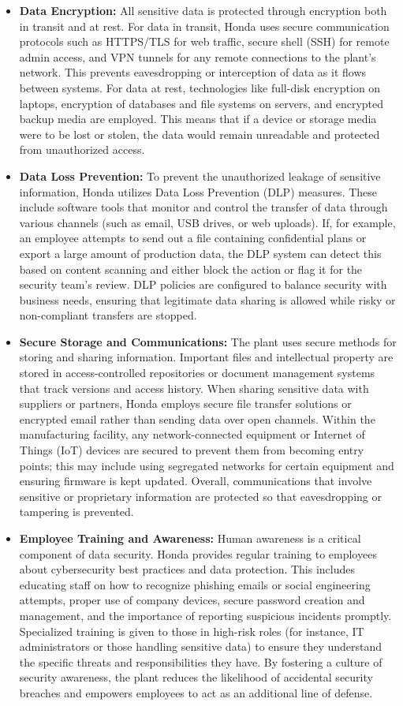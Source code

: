 \begin{itemize}
    \item \textbf{Data Encryption:} All sensitive data is protected through encryption both in transit and at rest. For data in transit, Honda uses secure communication protocols such as HTTPS/TLS for web traffic, secure shell (SSH) for remote admin access, and VPN tunnels for any remote connections to the plant’s network. This prevents eavesdropping or interception of data as it flows between systems. For data at rest, technologies like full-disk encryption on laptops, encryption of databases and file systems on servers, and encrypted backup media are employed. This means that if a device or storage media were to be lost or stolen, the data would remain unreadable and protected from unauthorized access.
    \item \textbf{Data Loss Prevention:} To prevent the unauthorized leakage of sensitive information, Honda utilizes Data Loss Prevention (DLP) measures. These include software tools that monitor and control the transfer of data through various channels (such as email, USB drives, or web uploads). If, for example, an employee attempts to send out a file containing confidential plans or export a large amount of production data, the DLP system can detect this based on content scanning and either block the action or flag it for the security team’s review. DLP policies are configured to balance security with business needs, ensuring that legitimate data sharing is allowed while risky or non-compliant transfers are stopped.
    \item \textbf{Secure Storage and Communications:} The plant uses secure methods for storing and sharing information. Important files and intellectual property are stored in access-controlled repositories or document management systems that track versions and access history. When sharing sensitive data with suppliers or partners, Honda employs secure file transfer solutions or encrypted email rather than sending data over open channels. Within the manufacturing facility, any network-connected equipment or Internet of Things (IoT) devices are secured to prevent them from becoming entry points; this may include using segregated networks for certain equipment and ensuring firmware is kept updated. Overall, communications that involve sensitive or proprietary information are protected so that eavesdropping or tampering is prevented.
    \item \textbf{Employee Training and Awareness:} Human awareness is a critical component of data security. Honda provides regular training to employees about cybersecurity best practices and data protection. This includes educating staff on how to recognize phishing emails or social engineering attempts, proper use of company devices, secure password creation and management, and the importance of reporting suspicious incidents promptly. Specialized training is given to those in high-risk roles (for instance, IT administrators or those handling sensitive data) to ensure they understand the specific threats and responsibilities they have. By fostering a culture of security awareness, the plant reduces the likelihood of accidental security breaches and empowers employees to act as an additional line of defense.

\end{itemize}

